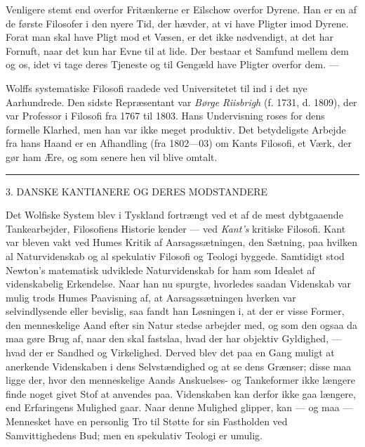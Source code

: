 \documentclass[12pt,a4paper,openany]{book}
\newcommand{\opage}[1]{\marginnote{\footnotesize\textit{[#1]}}}
\begin{document}
Venligere stemt end overfor Fritænkerne er Eilschow overfor Dyrene. Han er en
af de første Filosofer i den nyere Tid,
\setcounter{footnote}{0}%
\opage{24}der hævder, at vi have Pligter imod Dyrene. Forat man skal have Pligt
mod et Væsen, er det ikke nødvendigt, at det har Fornuft, naar det kun har Evne
til at lide. Der bestaar et Samfund mellem dem og os, idet vi tage deres
Tjeneste og til Gengæld have Pligter overfor dem. ---

Wolffs systematiske Filosofi raadede ved Universitetet til ind i det nye
Aarhundrede. Den sidste Repræsentant var \emph{Børge} \emph{Riisbrigh} (f.
1731, d. 1809), der var Professor i Filosofi fra 1767 til 1803. Hans
Undervisning roses for dens formelle Klarhed, men han var ikke meget produktiv.
Det betydeligste Arbejde fra hans Haand er en Afhandling (fra 1802---03) om
Kants Filosofi, et Værk, der gør ham Ære, og som senere hen vil blive omtalt.

\begin{center}\rule{2cm}{0.4pt}\end{center}

\setcounter{footnote}{0}%
\opage{25}

\begin{center}\large 3. DANSKE KANTIANERE OG DERES MODSTANDERE\end{center}

Det Wolfiske System blev i Tyskland fortrængt ved et af de mest dybtgaaende
Tankearbejder, Filosofiens Historie kender --- ved \emph{Kant's} kritiske
Filosofi. Kant var bleven vakt ved Humes Kritik af Aarsagssætningen, den
Sætning, paa hvilken al Naturvidenskab og al spekulativ Filosofi og Teologi
byggede. Samtidigt stod Newton's matematisk udviklede Naturvidenskab for ham
som Idealet af videnskabelig Erkendelse. Naar han nu spurgte, hvorledes saadan
Videnskab var mulig trods Humes Paavisning af, at Aarsagssætningen hverken var
selvindlysende eller bevislig, saa fandt han Løsningen i, at der er visse
Former, den menneskelige Aand efter sin Natur stedse arbejder med, og som den
ogsaa da maa gøre Brug af, naar den skal fastslaa, hvad der har objektiv
Gyldighed, --- hvad der er Sandhed og Virkelighed. Derved blev det paa en Gang
muligt at anerkende Videnskaben i dens Selvstændighed og at se dens Grænser;
disse maa ligge der, hvor den menneskelige Aands Anskuelses- og Tankeformer
ikke længere finde noget givet Stof at anvendes paa. Videnskaben kan derfor
ikke gaa længere, end Erfaringens Mulighed gaar. Naar denne Mulighed glipper,
kan --- og maa --- Mennesket have en personlig Tro til Støtte for sin
Fastholden ved Samvittighedens Bud; men en spekulativ Teologi er umulig.
\end{document}
